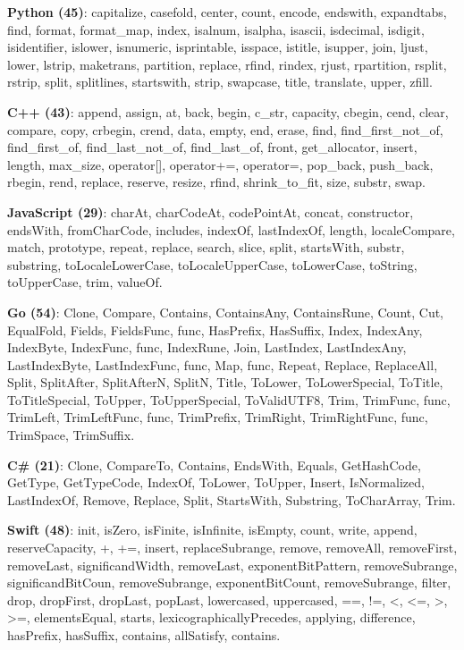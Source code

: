 \documentclass[anonymous,sigplan,review,11pt,nonacm,natbib=false]{acmart}
\begin{document}
    \textbf{Python (45)}: capitalize, casefold, center, count, encode, endswith, expandtabs, find, format, format\_map, index, isalnum, isalpha, isascii, isdecimal, isdigit, isidentifier, islower, isnumeric, isprintable, isspace, istitle, isupper, join, ljust, lower, lstrip, maketrans, partition, replace, rfind, rindex, rjust, rpartition, rsplit, rstrip, split, splitlines, startswith, strip, swapcase, title, translate, upper, zfill.

    \textbf{C++ (43)}: append, assign, at, back, begin, c\_str, capacity, cbegin, cend, clear, compare, copy, crbegin, crend, data, empty, end, erase, find, find\_first\_not\_of, find\_first\_of, find\_last\_not\_of, find\_last\_of, front, get\_allocator, insert, length, max\_size, operator[], operator+=, operator=, pop\_back, push\_back, rbegin, rend, replace, reserve, resize, rfind, shrink\_to\_fit, size, substr, swap.

    \textbf{JavaScript (29)}: charAt, charCodeAt, codePointAt, concat, constructor, endsWith, fromCharCode, includes, indexOf, lastIndexOf, length, localeCompare, match, prototype, repeat, replace, search, slice, split, startsWith, substr, substring, toLocaleLowerCase, toLocaleUpperCase, toLowerCase, toString, toUpperCase, trim, valueOf.

    \textbf{Go (54)}: Clone, Compare, Contains, ContainsAny, ContainsRune, Count, Cut, EqualFold, Fields, FieldsFunc, func, HasPrefix, HasSuffix, Index, IndexAny, IndexByte, IndexFunc, func, IndexRune, Join, LastIndex, LastIndexAny, LastIndexByte, LastIndexFunc, func, Map, func, Repeat, Replace, ReplaceAll, Split, SplitAfter, SplitAfterN, SplitN, Title, ToLower, ToLowerSpecial, ToTitle, ToTitleSpecial, ToUpper, ToUpperSpecial, ToValidUTF8, Trim, TrimFunc, func, TrimLeft, TrimLeftFunc, func, TrimPrefix, TrimRight, TrimRightFunc, func, TrimSpace, TrimSuffix.

    \textbf{C\# (21)}: Clone, CompareTo, Contains, EndsWith, Equals, GetHashCode, GetType, GetTypeCode, IndexOf, ToLower, ToUpper, Insert, IsNormalized, LastIndexOf, Remove, Replace, Split, StartsWith, Substring, ToCharArray, Trim.

    \textbf{Swift (48)}: init, isZero, isFinite, isInfinite, isEmpty, count, write, append, reserveCapacity, +, +=, insert, replaceSubrange, remove, removeAll, removeFirst, removeLast, significandWidth, removeLast, exponentBitPattern, removeSubrange, significandBitCoun, removeSubrange, exponentBitCount, removeSubrange, filter, drop, dropFirst, dropLast, popLast, lowercased, uppercased, ==, !=, <, <=, >, >=, elementsEqual, starts, lexicographicallyPrecedes, applying, difference, hasPrefix, hasSuffix, contains, allSatisfy, contains.
\end{document}
